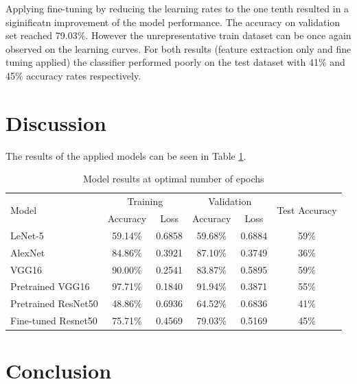 \documentclass[10pt, final]{article}
\begin{document}
Applying fine-tuning by reducing the learning rates to the one tenth resulted in a siginificatn improvement
of the model performance.
The accuracy on validation set reached 79.03\%.
However the unrepresentative train dataset can be once again observed on the learning curves.
For both results (feature extraction only and fine tuning applied) the classifier performed poorly on the test
dataset with 41\% and 45\% accuracy rates respectively.

\section{Discussion} \label{sec:discussion}

The results of the applied models can be seen in Table \ref{table:results_summary}.

\begin{table}[!ht]
	\centering
	\begin{tabular}{l c c c c c}
		\multirow{2}{*}{Model} & \multicolumn{2}{c}{Training} & \multicolumn{2}{c}{Validation} & \multirow{2}{*}{Test Accuracy}                 \\
		                       & Accuracy                     & Loss                           & Accuracy                       & Loss   &      \\
		\hline
		LeNet-5                & 59.14\%                      & 0.6858                         & 59.68\%                        & 0.6884 & 59\% \\
		AlexNet                & 84.86\%                      & 0.3921                         & 87.10\%                        & 0.3749 & 36\% \\
		VGG16                  & 90.00\%                      & 0.2541                         & 83.87\%                        & 0.5895 & 59\% \\
		Pretrained VGG16       & 97.71\%                      & 0.1840                         & 91.94\%                        & 0.3871 & 55\% \\
		Pretrained ResNet50    & 48.86\%                      & 0.6936                         & 64.52\%                        & 0.6836 & 41\% \\
		Fine-tuned Resnet50    & 75.71\%                      & 0.4569                         & 79.03\%                        & 0.5169 & 45\% \\
		\hline
	\end{tabular}
	\caption{Model results at optimal number of epochs}
	\label{table:results_summary}
\end{table}

\section{Conclusion} \label{sec:conclusion}
\newpage
\listoffigures
\newpage
\listoftables
\newpage
\printbibliography
\end{document}

